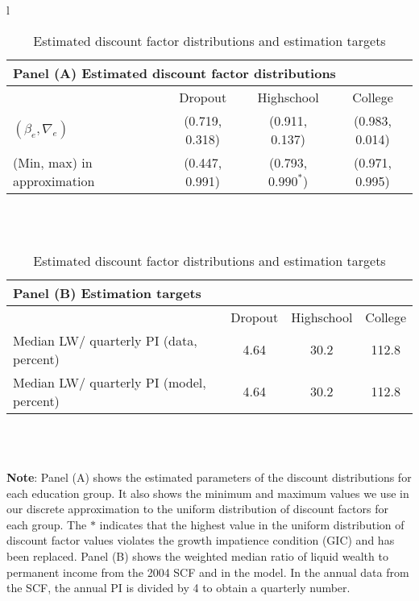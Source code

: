 \documentclass[\econtexRoot/HAFiscal]{subfiles}
\begin{document}
\begin{table}[th]
  \begin{center}
    \begin{tabular}{l}
      \begin{tabular}{lccc}
        \multicolumn{4}{l}{Panel (A) Estimated discount factor distributions} \\ \midrule
        & Dropout & Highschool & College \\ \midrule
        $(\beta_e, \nabla_e)$ & (0.719, 0.318) & (0.911, 0.137) & (0.983, 0.014) \\
        (Min, max) in approximation & (0.447, 0.991) & (0.793, $0.990^*$) & (0.971, 0.995) \\
        \midrule 
      \end{tabular} \\ \\ 
      
      \begin{tabular}{lccc}
        \multicolumn{4}{l}{Panel (B) Estimation targets} \\ \midrule
        & Dropout & Highschool & College \\ \midrule
        Median LW/ quarterly PI (data, percent) & 4.64 & 30.2 & 112.8 \\ 
        Median LW/ quarterly PI (model, percent) & 4.64 & 30.2 & 112.8 %
        \\ \midrule 
      \end{tabular} \\ \\ 
    \end{tabular}
    \caption{Estimated discount factor distributions and estimation targets}
    \notinsubfile{\label{tab:estimBetas}}
    \parbox{16cm}{\small \vspace{.15cm} \textbf{Note}: Panel (A) shows the estimated parameters of the discount distributions for each education group.
It also shows the minimum and maximum values we use in our discrete approximation to the uniform distribution of discount factors for each group.
The $*$ indicates that the highest value in the uniform distribution of discount factor values violates the growth impatience condition (GIC) and has been replaced.
Panel (B) shows the weighted median ratio of liquid wealth to permanent income from the 2004 SCF and in the model.
In the annual data from the SCF, the annual PI is divided by 4 to obtain a quarterly number.\normalsize}
  \end{center}
\end{table}
\end{document}
